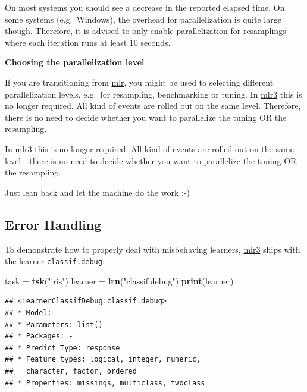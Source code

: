 \documentclass[]{article}
\newenvironment{Shaded}{\begin{snugshade}}{\end{snugshade}}
\newcommand{\KeywordTok}[1]{\textcolor[rgb]{0.13,0.29,0.53}{\textbf{#1}}}
\newcommand{\NormalTok}[1]{#1}
\newcommand{\StringTok}[1]{\textcolor[rgb]{0.31,0.60,0.02}{#1}}
\renewenvironment{Shaded} {\begin{snugshade}\small} {\end{snugshade}}
\begin{document}
On most systems you should see a decrease in the reported elapsed time.
On some systems (e.g.~Windows), the overhead for parallelization is quite large though.
Therefore, it is advised to only enable parallelization for resamplings where each iteration runs at least 10 seconds.

\textbf{Choosing the parallelization level}

If you are transitioning from \href{https://cran.r-project.org/package=mlr}{mlr}, you might be used to selecting different parallelization levels, e.g.~for resampling, benchmarking or tuning.
In \href{https://mlr3.mlr-org.com}{mlr3} this is no longer required.
All kind of events are rolled out on the same level.
Therefore, there is no need to decide whether you want to parallelize the tuning OR the resampling.

In \href{https://mlr3.mlr-org.com}{mlr3} this is no longer required.
All kind of events are rolled out on the same level - there is no need to decide whether you want to parallelize the tuning OR the resampling.

Just lean back and let the machine do the work :-)

\hypertarget{error-handling}{%
\subsection{Error Handling}\label{error-handling}}

To demonstrate how to properly deal with misbehaving learners, \href{https://mlr3.mlr-org.com}{mlr3} ships with the learner \href{https://mlr3.mlr-org.com/reference/mlr_learners_classif.debug.html}{\texttt{classif.debug}}:

\begin{Shaded}
\begin{Highlighting}[]
\NormalTok{task =}\StringTok{ }\KeywordTok{tsk}\NormalTok{(}\StringTok{"iris"}\NormalTok{)}
\NormalTok{learner =}\StringTok{ }\KeywordTok{lrn}\NormalTok{(}\StringTok{"classif.debug"}\NormalTok{)}
\KeywordTok{print}\NormalTok{(learner)}
\end{Highlighting}
\end{Shaded}

\begin{verbatim}
## <LearnerClassifDebug:classif.debug>
## * Model: -
## * Parameters: list()
## * Packages: -
## * Predict Type: response
## * Feature types: logical, integer, numeric,
##   character, factor, ordered
## * Properties: missings, multiclass, twoclass
\end{verbatim}
\end{document}
